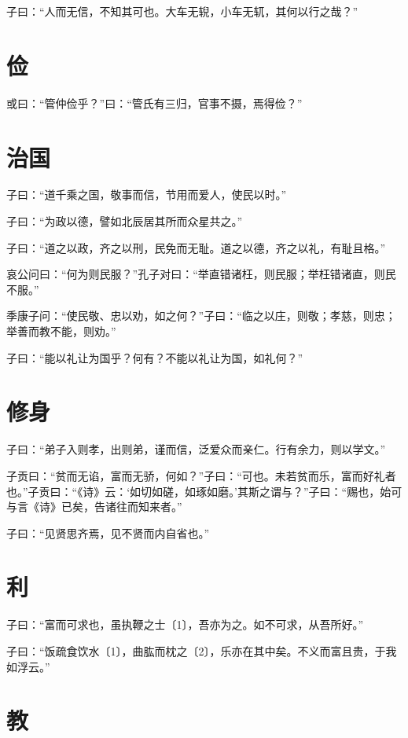 \documentclass[a5paper]{ctexbook}
\begin{document}
    子曰：“人而无信，不知其可也。大车无𫐐，小车无𫐄，其何以行之哉？”

    \chapter{俭}

    或曰：“管仲俭乎？”曰：“管氏有三归，官事不摄，焉得俭？”

    \chapter{治国}

    子曰：“道千乘之国，敬事而信，节用而爱人，使民以时。”

    子曰：“为政以德，譬如北辰居其所而众星共之。”

    子曰：“道之以政，齐之以刑，民免而无耻。道之以德，齐之以礼，有耻且格。”

    哀公问曰：“何为则民服？”孔子对曰：“举直错诸枉，则民服；举枉错诸直，则民不服。”

    季康子问：“使民敬、忠以劝，如之何？”子曰：“临之以庄，则敬；孝慈，则忠；举善而教不能，则劝。”

    子曰：“能以礼让为国乎？何有？不能以礼让为国，如礼何？”

    \chapter{修身}

    子曰：“弟子入则孝，出则弟，谨而信，泛爱众而亲仁。行有余力，则以学文。”

    子贡曰：“贫而无谄，富而无骄，何如？”子曰：“可也。未若贫而乐，富而好礼者也。”子贡曰：“《诗》云：‘如切如磋，如琢如磨。’其斯之谓与？”子曰：“赐也，始可与言《诗》已矣，告诸往而知来者。”

    子曰：“见贤思齐焉，见不贤而内自省也。”

    \chapter{利}

    子曰：“富而可求也，虽执鞭之士〔1〕，吾亦为之。如不可求，从吾所好。”

    子曰：“饭疏食饮水〔1〕，曲肱而枕之〔2〕，乐亦在其中矣。不义而富且贵，于我如浮云。”

    \chapter{教}
\end{document}
